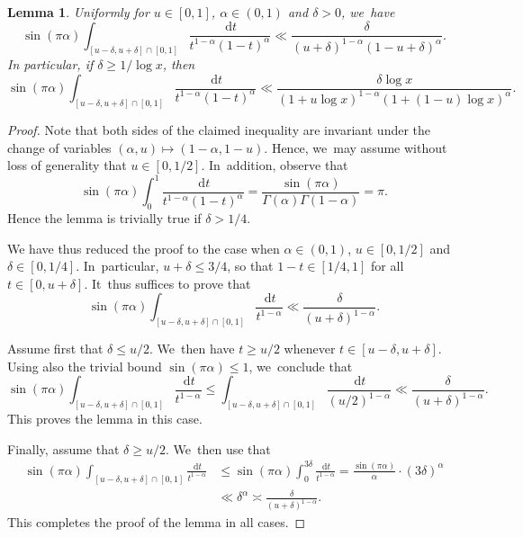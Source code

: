 \documentclass[10pt,a4paper]{article}
\newcommand{\dee}{\,\mathrm{d}}
\theoremstyle{plain}
\newtheorem{lem}[cor]{Lemma}
\theoremstyle{definition}
\begin{document}
\begin{lem}\label{lem:beta estimate}
Uniformly for $u\in[0,1]$, $\alpha \in (0, 1)$ and $\delta > 0$, we~have
\[
\sin(\pi\alpha) \int_{[u-\delta,u+\delta]\cap[0,1]} \frac{\dee t}{t^{1-\alpha}(1-t)^\alpha} \ll \frac{\delta}{(u+\delta)^{1-\alpha}(1-u+\delta)^\alpha}.
\]
In particular, if $\delta\ge1/\log x$, then
\[
\sin(\pi\alpha) \int_{[u-\delta,u+\delta]\cap[0,1]} \frac{\dee t}{t^{1-\alpha}(1-t)^\alpha} \ll \frac{\delta\log x}{(1+u\log x)^{1-\alpha}(1+(1-u)\log x)^\alpha}.
\]
\end{lem}

\begin{proof} Note that both sides of the claimed inequality are invariant under the change of variables $(\alpha,u)\mapsto (1-\alpha,1-u)$. Hence, we~may assume without loss of generality that $u\in[0,1/2]$. In~addition, observe that
\[
\sin(\pi\alpha)\int_0^1 \frac{\dee t}{t^{1-\alpha}(1-t)^\alpha} = \frac{\sin(\pi\alpha)}{\Gamma(\alpha)\Gamma(1-\alpha)} = \pi.
\]
Hence the lemma is trivially true if $\delta > 1/4$.

We have thus reduced the proof to the case when $\alpha\in(0,1)$, $u\in[0,1/2]$ and $\delta\in[0,1/4]$. In~particular, $u+\delta\le 3/4$, so that $1-t\in[1/4,1]$ for all $t\in[0,u+\delta]$. It~thus suffices to prove that
\begin{equation}
\label{eq:beta bound - new goal}
\sin(\pi\alpha) \int_{[u-\delta,u+\delta]\cap[0,1]} \frac{\dee t}{t^{1-\alpha}} \ll \frac{\delta}{(u+\delta)^{1-\alpha}}.
\end{equation}

Assume first that $\delta\le u/2$. We~then have $t\ge u/2$ whenever $t\in[u-\delta,u+\delta]$. Using also the trivial bound $\sin(\pi\alpha)\le1$, we~conclude that
\[
\sin(\pi\alpha) \int_{[u-\delta,u+\delta]\cap[0,1]} \frac{\dee t}{t^{1-\alpha}} \le \int_{[u-\delta,u+\delta]\cap[0,1]} \frac{\dee t}{(u/2)^{1-\alpha}} \ll \frac{\delta}{(u+\delta)^{1-\alpha}}.
\]
This proves the lemma in this case.

Finally, assume that $\delta\ge u/2$. We~then use that
\begin{align*}
\sin(\pi\alpha) \int_{[u-\delta,u+\delta]\cap[0,1]} \frac{\dee t}{t^{1-\alpha}}
&\le \sin(\pi\alpha)\int_0^{3\delta} \frac{\dee t}{t^{1-\alpha}} =\frac{\sin(\pi \alpha)}{\alpha} \cdot (3\delta)^\alpha \\
&\ll \delta^\alpha \asymp \frac{\delta}{(u+\delta)^{1-\alpha}}.
\end{align*}
This completes the proof of the lemma in all cases.
\end{proof}
\end{document}
